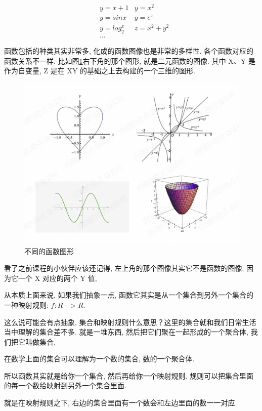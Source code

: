 \begin{align*}
  & y = x + 1 & y = x^2 \\
  & y = sinx & y = e^x \\  
  & y = log_2^x & z = x^2 + y^2 \\ 
  & ...
\end{align*}

函数包括的种类其实非常多, 化成的函数图像也是非常的多样性. 各个函数对应的函数关系不一样. 比如图\ref{fig:img7_1}右下角的那个图形, 就是二元函数的图像. 其中 X、Y 是作为自变量, Z 是在 XY 的基础之上去构建的一个三维的图形. 

\begin{figure}[ht]
  \centering
  \includegraphics[width=1\textwidth]{asset/0c36f8c5-0b4f-4fc1-a5dc-a206fd7e2db2.png}
  \caption{不同的函数图形}
  \label{fig:img7_1}
\end{figure}

看了之前课程的小伙伴应该还记得, 左上角的那个图像其实它不是函数的图像. 因为它一个 X 对应的两个 Y 值, 

从本质上面来说, 如果我们抽象一点, 函数它其实是从一个集合到另外一个集合的一种映射规则: $f:R -> R$.

这么说可能会有点抽象, 集合和映射规则什么意思？这里的集合就和我们日常生活当中理解的集合差不多. 就是一堆东西, 然后把它们聚在一起形成的一个聚合体, 我们把它叫做集合. 

在数学上面的集合可以理解为一个数的集合, 数的一个聚合体. 

所以函数其实就是给你一个集合, 然后再给你一个映射规则. 规则可以把集合里面的每一个数给映射到另外一个集合里面. 

就是在映射规则之下, 右边的集合里面有一个数会和左边里面的数一一对应. 

